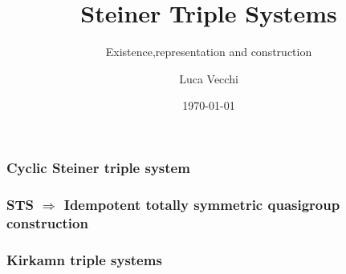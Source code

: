 \documentclass{beamer}
\title{Steiner Triple Systems}
\subtitle{Existence,representation and construction}
\author{Luca Vecchi}
\institute{University of Milan}
\date{\today}
\begin{document}
	\begin{frame}
	\titlepage
	\end{frame}
	
	
	
	
	
	
	
	

	\begin{frame}
	\frametitle{Cyclic Steiner triple system}
	\end{frame}

	\begin{frame}
	\frametitle{STS $\Rightarrow$ Idempotent totally symmetric quasigroup construction}
	\end{frame}

	\begin{frame}
	\frametitle{Kirkamn triple systems}
	\end{frame}
\end{document}
